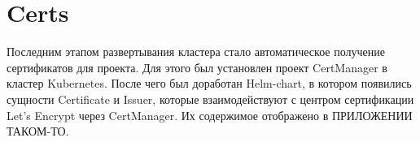 \section{Certs}
\label{sec:certs}

Последним этапом развертывания кластера стало автоматическое получение сертификатов для проекта. Для этого был установлен проект CertManager
в кластер Kubernetes. После чего был доработан Helm-chart, в котором появились сущности Certificate
и Issuer,
которые взаимодействуют с центром сертификации Let's Encrypt
через CertManager. Их содержимое отображено в ПРИЛОЖЕНИИ ТАКОМ-ТО.
